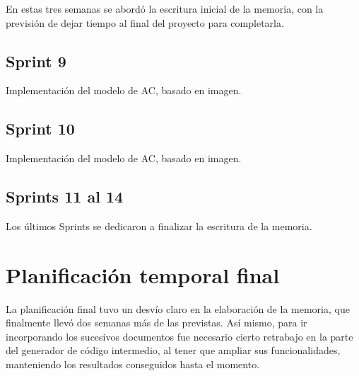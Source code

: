 En estas tres semanas se abordó la escritura inicial de la memoria, con la previsión de dejar tiempo al final del proyecto para completarla.

\subsection{Sprint 9}

Implementación del modelo de AC, basado en imagen.

\subsection{Sprint 10}

Implementación del modelo de AC, basado en imagen.

\subsection{Sprints 11 al 14}

Los últimos Sprints se dedicaron a finalizar la escritura de la memoria.

\section{Planificación temporal final}

La planificación final tuvo un desvío claro en la elaboración de la memoria, que finalmente llevó dos semanas más de las previstas. Así mismo, para ir incorporando los sucesivos documentos fue necesario cierto retrabajo en la parte del generador de código intermedio, al tener que ampliar sus funcionalidades, manteniendo los resultados conseguidos hasta el momento.

